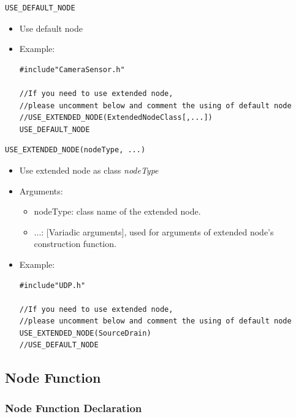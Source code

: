 \documentclass[a4paper,10pt]{book}
\begin{document}
\begin{mdframed}
\begin{verbatim}
USE_DEFAULT_NODE
\end{verbatim}
\begin{itemize}
 \item Use default node
 \item Example:
\begin{verbatim}
#include"CameraSensor.h"

//If you need to use extended node, 
//please uncomment below and comment the using of default node
//USE_EXTENDED_NODE(ExtendedNodeClass[,...])
USE_DEFAULT_NODE
\end{verbatim}
\end{itemize}
\end{mdframed}

\begin{mdframed}
\begin{verbatim}
USE_EXTENDED_NODE(nodeType, ...)
\end{verbatim}
\begin{itemize}
 \item Use extended node as class {\em{nodeType}}
 \item Arguments:
 \begin{itemize}
  \item nodeType: class name of the extended node.
  \item ...: [Variadic arguments], used for arguments of extended node's construction function. 
 \end{itemize}
 \item Example:
\begin{verbatim}
#include"UDP.h"

//If you need to use extended node, 
//please uncomment below and comment the using of default node
USE_EXTENDED_NODE(SourceDrain)
//USE_DEFAULT_NODE
\end{verbatim}
\end{itemize}
\end{mdframed}

\subsection{Node Function}

\subsubsection{Node Function Declaration}
\end{document}
